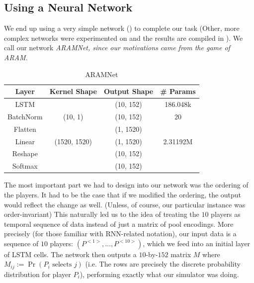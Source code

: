 \subsection{Using a Neural Network}
We end up using a very simple network () to complete our task (Other, more complex networks were experimented on and the results are compiled in ).
We call our network \it{ARAMNet}, since our motivations came from the game of ARAM.

\begin{table}[htbp]
    \centering
    \bgroup
    \def\arraystretch{1.5}
    \begin{tabular}{|c|c|c|c|}
        \hline
        Layer       & Kernel Shape & Output Shape & \# Params \\
        \hline
        LSTM        &              & (10, 152)    & 186.048k  \\
        \hline
        BatchNorm   & (10, 1)      & (10, 152)    & 20        \\
        \hline 
        Flatten     &              & (1, 1520)    &           \\ 
        \hline
        Linear      & (1520, 1520) & (1, 1520)    & 2.31192M  \\ 
        \hline
        Reshape     &              & (10, 152)    &           \\ 
        \hline
        Softmax     &              & (10, 152)    &           \\ 
        \hline
    \end{tabular}
    \egroup
    \caption{ARAMNet}
    \label{table:simple-network}
\end{table}

The most important part we had to design into our network was the ordering of the players.
It had to be the case that if we modified the ordering, the output would reflect the change as well.
(Unless, of course, our particular instance was order-invariant)
This naturally led us to the idea of treating the $10$ players as temporal sequence of data instead of just a matrix of pool encodings.
More precisely (for those familiar with RNN-related notation), our input data is a sequence of $10$ players: $(P^{<1>}, \ldots, P^{<10>})$, which we feed into an initial layer of LSTM cells.
The network then outputs a $10$-by-$152$ matrix $M$ where $M_{ij} := \Pr(P_i \text{ selects } j)$ (i.e. The rows are precisely the discrete probability distribution for player $P_i$), performing exactly what our simulator was doing.

